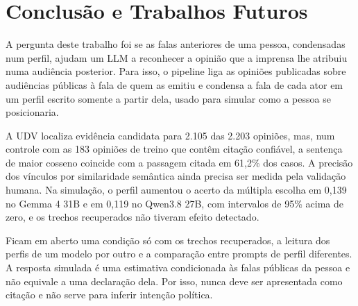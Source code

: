 \section{Conclus\~ao e Trabalhos Futuros}
\label{sec:conclusao}

A pergunta deste trabalho foi se as falas anteriores de uma pessoa, condensadas num perfil, ajudam
um LLM a reconhecer a opinião que a imprensa lhe atribuiu numa audiência posterior. Para isso, o
pipeline liga as opiniões publicadas sobre audiências públicas à fala de quem as emitiu e condensa a
fala de cada ator em um perfil escrito somente a partir dela, usado para simular como a pessoa se
posicionaria.

A UDV localiza evidência candidata para 2.105 das 2.203 opiniões, mas, num controle com as 183
opiniões de treino que contêm citação confiável, a sentença de maior cosseno coincide com a passagem
citada em 61,2\% dos casos. A precisão dos vínculos por similaridade semântica ainda precisa ser
medida pela validação humana. Na simulação, o perfil aumentou o acerto da múltipla escolha em 0,139
no Gemma 4 31B e em 0,119 no Qwen3.8 27B, com intervalos de 95\% acima de zero, e os trechos
recuperados não tiveram efeito detectado.

Ficam em aberto uma condição só com os trechos recuperados, a leitura dos perfis de um modelo por
outro e a comparação entre prompts de perfil diferentes. A resposta simulada é uma estimativa condicionada às falas públicas da
pessoa e não equivale a uma declaração dela. Por isso, nunca deve ser apresentada como citação e
não serve para inferir intenção política.
